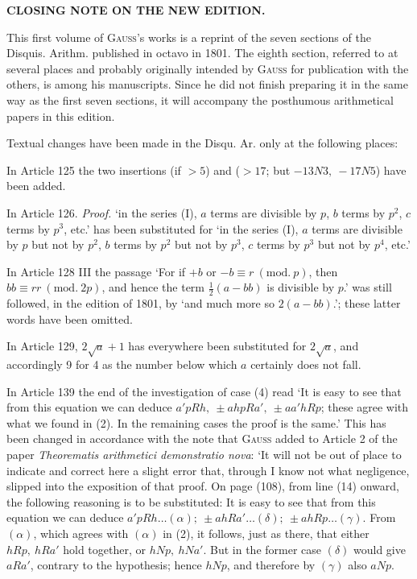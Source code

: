 \begin{center}\bfseries CLOSING NOTE ON THE NEW EDITION.\end{center}

This first volume of \textsc{Gauss}'s works is a reprint of the seven sections of the Disquis. Arithm. published in octavo in 1801. The eighth section, referred to at several places and probably originally intended by \textsc{Gauss} for publication with the others, is among his manuscripts. Since he did not finish preparing it in the same way as the first seven sections, it will accompany the posthumous arithmetical papers in this edition.

Textual changes have been made in the Disqu. Ar. only at the following places:

In Article 125 the two insertions (if \(>5\)) and (\(>17\); but \(-13N3,\allowbreak\ -17N5\)) have been added.

In Article 126. \textit{Proof.} ‘in the series (I), \(a\) terms are divisible by \(p\), \(b\) terms by \(p^2\), \(c\) terms by \(p^3\), etc.’ has been substituted for ‘in the series (I), \(a\) terms are divisible by \(p\) but not by \(p^2\), \(b\) terms by \(p^2\) but not by \(p^3\), \(c\) terms by \(p^3\) but not by \(p^4\), etc.’

In Article 128 III the passage ‘For if \(+b\) or \(-b\equiv r\ (\mathrm{mod.}\ p)\), then \(bb\equiv rr\ (\mathrm{mod.}\ 2p)\), and hence the term \(\frac12(a-bb)\) is divisible by \(p\).’ was still followed, in the edition of 1801, by ‘and much more so \(2(a-bb)\).’; these latter words have been omitted.

In Article 129, \(2\surd a+1\) has everywhere been substituted for \(2\surd a\), and accordingly 9 for 4 as the number below which \(a\) certainly does not fall.

In Article 139 the end of the investigation of case (4) read ‘It is easy to see that from this equation we can deduce \(a'pRh,\allowbreak\ \pm ahpRa',\allowbreak\ \pm aa'hRp\); these agree with what we found in (2). In the remaining cases the proof is the same.’ This has been changed in accordance with the note that \textsc{Gauss} added to Article 2 of the paper \textit{Theorematis arithmetici demonstratio nova}: ‘It will not be out of place to indicate and correct here a slight error that, through I know not what negligence, slipped into the exposition of that proof. On page (108), from line (14) onward, the following reasoning is to be substituted: It is easy to see that from this equation we can deduce \(a'pRh\ldots(\alpha);\allowbreak\ \pm ahRa'\ldots(\delta);\allowbreak\ \pm ahRp\ldots(\gamma)\). From \((\alpha)\), which agrees with \((\alpha)\) in (2), it follows, just as there, that either \(hRp,\allowbreak\ hRa'\) hold together, or \(hNp,\allowbreak\ hNa'\). But in the former case \((\delta)\) would give \(aRa'\), contrary to the hypothesis; hence \(hNp\), and therefore by \((\gamma)\) also \(aNp\).

